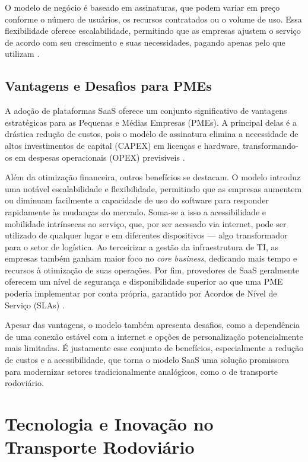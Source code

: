 O modelo de negócio é baseado em assinaturas, que podem variar em preço conforme o número de usuários, os recursos contratados ou o volume de uso. Essa flexibilidade oferece escalabilidade, permitindo que as empresas ajustem o serviço de acordo com seu crescimento e suas necessidades, pagando apenas pelo que utilizam \cite{prologapp2024saas}.

\subsection{Vantagens e Desafios para PMEs}

A adoção de plataformas SaaS oferece um conjunto significativo de vantagens estratégicas para as Pequenas e Médias Empresas (PMEs). A principal delas é a drástica redução de custos, pois o modelo de assinatura elimina a necessidade de altos investimentos de capital (CAPEX) em licenças e hardware, transformando-os em despesas operacionais (OPEX) previsíveis \cite{praxio2021vantagens}.

Além da otimização financeira, outros benefícios se destacam. O modelo introduz uma notável escalabilidade e flexibilidade, permitindo que as empresas aumentem ou diminuam facilmente a capacidade de uso do software para responder rapidamente às mudanças do mercado. Soma-se a isso a acessibilidade e mobilidade intrínsecas ao serviço, que, por ser acessado via internet, pode ser utilizado de qualquer lugar e em diferentes dispositivos — algo transformador para o setor de logística. Ao terceirizar a gestão da infraestrutura de TI, as empresas também ganham maior foco no \textit{core business}, dedicando mais tempo e recursos à otimização de suas operações. Por fim, provedores de SaaS geralmente oferecem um nível de segurança e disponibilidade superior ao que uma PME poderia implementar por conta própria, garantido por Acordos de Nível de Serviço (SLAs) \cite{prologapp2024saas, praxio2021vantagens}.

Apesar das vantagens, o modelo também apresenta desafios, como a dependência de uma conexão estável com a internet e opções de personalização potencialmente mais limitadas. É justamente esse conjunto de benefícios, especialmente a redução de custos e a acessibilidade, que torna o modelo SaaS uma solução promissora para modernizar setores tradicionalmente analógicos, como o de transporte rodoviário.

\section{Tecnologia e Inovação no Transporte Rodoviário}

